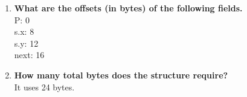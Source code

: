 \documentclass{article}
\begin{document}
\begin{enumerate}[label=\textbf{\Alph*.}]
	\item \textbf{What are the offsets (in bytes) of the following fields.} \\
	P: 0 \\
	s.x: 8 \\
	s.y: 12 \\
	next: 16 \\
	\item \textbf{How many total bytes does the structure require?} \\
	It uses 24 bytes.
\end{enumerate}
\end{document}
